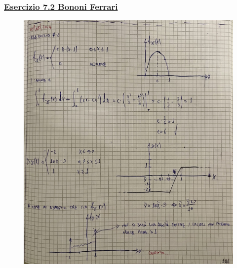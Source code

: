 \documentclass{article}
\begin{document}
\subsubsection{\underline{Esercizio 7.2 Bononi Ferrari}}
\begin{figure}[H]
\centering
\includegraphics[scale=0.10]{ese/34.jpeg}
\end{figure}
\end{document}
